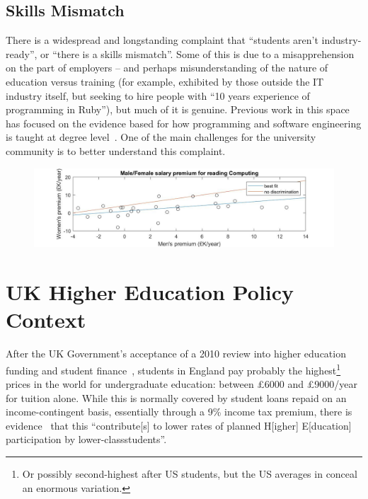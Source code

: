 \documentclass[conference]{IEEEtran}
\begin{document}
\subsection{Skills Mismatch}\label{sec:Skills}

There is a widespread and longstanding complaint that ``students
aren't industry-ready'', or ``there is a skills mismatch''. Some of
this is due to a misapprehension on the part of employers -- and
perhaps misunderstanding of the nature of education versus training
(for example, exhibited by those outside the IT industry itself, but
seeking to hire people with ``10 years experience of programming in
Ruby''), but much of it is genuine. Previous work in this space has
focused on the evidence based for how programming and software
engineering is taught at degree
level~\cite{davenport-et-al:latice2016,murphy-et-al:programming2017,simon-et-al:sigcse2018}. One
of the main challenges for the university community is to better
understand this complaint.

\begin{figure}
\includegraphics[width=\textwidth]{images/BBCSalaryDatav5.jpg}
\caption{\label{fig:BBC}}
\end{figure}

\section{UK Higher Education Policy Context}\label{ukhepolicy}

After the UK Government's acceptance of a 2010 review into higher
education funding and student finance~\cite{BIS2010a}, students in
England pay probably the highest\footnote{Or possibly second-highest
after US students, but the US averages in \cite[Table B5.1]{OECD2016a}
conceal an enormous variation.} prices in the world for undergraduate
education: between \pounds6000 and \pounds9000/year for tuition
alone. While this is normally covered by student loans repaid on an
income-contingent basis, essentially through a 9\% income tax premium,
there is evidence~\cite{CallenderMason2017a} that this ``contribute[s]
to lower rates of planned H[igher] E[ducation] participation by
lower-classstudents''.
\end{document}
